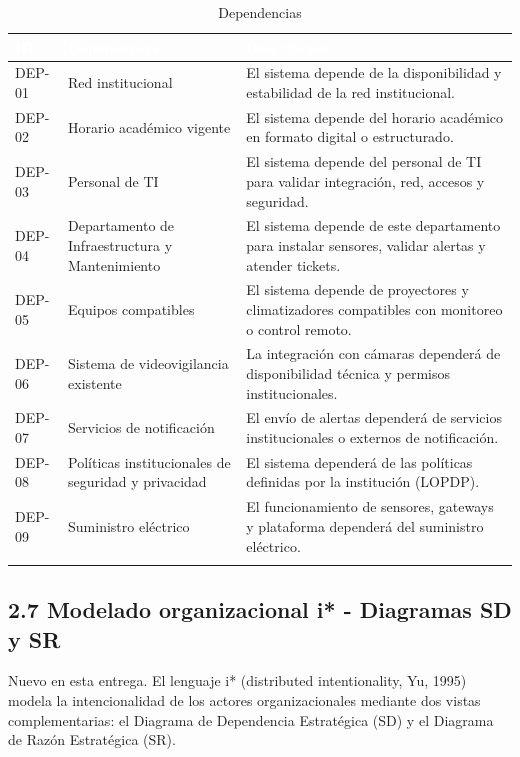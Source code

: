 
\begingroup
\small
\begin{longtable}{|p{5.2cm}|p{5.2cm}|p{5.2cm}|}
\hline
\cellcolor{sigagreen}\textcolor{white}{\textbf{ID}} & \cellcolor{sigagreen}\textcolor{white}{\textbf{Dependencia}} & \cellcolor{sigagreen}\textcolor{white}{\textbf{Descripción}} \\ \hline
DEP-01 & Red institucional & El sistema depende de la disponibilidad y estabilidad de la red institucional. \\ \hline
DEP-02 & Horario académico vigente & El sistema depende del horario académico en formato digital o estructurado. \\ \hline
DEP-03 & Personal de TI & El sistema depende del personal de TI para validar integración, red, accesos y seguridad. \\ \hline
DEP-04 & Departamento de Infraestructura y Mantenimiento & El sistema depende de este departamento para instalar sensores, validar alertas y atender tickets. \\ \hline
DEP-05 & Equipos compatibles & El sistema depende de proyectores y climatizadores compatibles con monitoreo o control remoto. \\ \hline
DEP-06 & Sistema de videovigilancia existente & La integración con cámaras dependerá de disponibilidad técnica y permisos institucionales. \\ \hline
DEP-07 & Servicios de notificación & El envío de alertas dependerá de servicios institucionales o externos de notificación. \\ \hline
DEP-08 & Políticas institucionales de seguridad y privacidad & El sistema dependerá de las políticas definidas por la institución (LOPDP). \\ \hline
DEP-09 & Suministro eléctrico & El funcionamiento de sensores, gateways y plataforma dependerá del suministro eléctrico. \\ \hline
\caption{Dependencias}
\end{longtable}
\endgroup

\subsection*{2.7 Modelado organizacional i* - Diagramas SD y SR}


Nuevo en esta entrega. El lenguaje i* (distributed intentionality, Yu, 1995) modela la intencionalidad de los actores organizacionales mediante dos vistas complementarias: el Diagrama de Dependencia Estratégica (SD) y el Diagrama de Razón Estratégica (SR).


